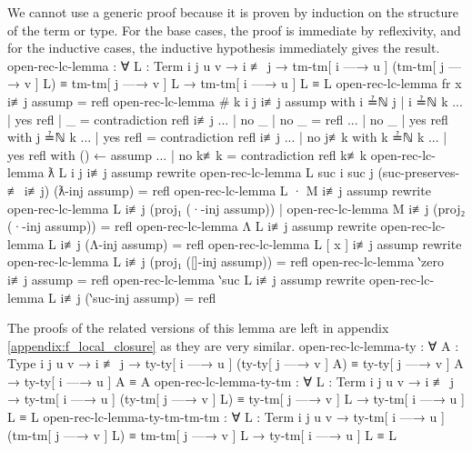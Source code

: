 \documentclass[logo,bsc,singlespacing,parskip,online]{infthesis}
\renewenvironment{code}{\mintedcopy[breaklines,breaksymbolleft=\;]{agda}}{\endmintedcopy}
\begin{document}
We cannot use a generic proof because it is proven by induction on the structure of the term or
type. For the base cases, the proof is immediate by reflexivity, and for the inductive cases, the
inductive hypothesis immediately gives the result.
\begin{code}
  open-rec-lc-lemma : ∀ {L : Term} {i j u v} → i ≢ j
    → tm-tm[ i —→ u ] (tm-tm[ j —→ v ] L) ≡ tm-tm[ j —→ v ] L
    → tm-tm[ i —→ u ] L ≡ L
  open-rec-lc-lemma {fr x} i≢j assump = refl
  open-rec-lc-lemma {# k} {i} {j} i≢j assump
    with i ≟ℕ j | i ≟ℕ k
  ... | yes refl | _ = contradiction refl i≢j
  ... | no _     | no _ = refl
  ... | no _     | yes refl with j ≟ℕ k
  ...   | yes refl = contradiction refl i≢j
  ...   | no j≢k with k ≟ℕ k
  ...     | yes refl with () ← assump
  ...     | no  k≢k  = contradiction refl k≢k
  open-rec-lc-lemma {ƛ L} {i} {j} i≢j assump
    rewrite open-rec-lc-lemma {L} {suc i} {suc j}
      (suc-preserves-≢ i≢j)
      (ƛ-inj assump) = refl
  open-rec-lc-lemma {L · M} i≢j assump rewrite
      open-rec-lc-lemma {L} i≢j (proj₁ (·-inj assump))
    | open-rec-lc-lemma {M} i≢j (proj₂ (·-inj assump)) = refl
  open-rec-lc-lemma {Λ L} i≢j assump
    rewrite open-rec-lc-lemma {L} i≢j (Λ-inj assump) = refl
  open-rec-lc-lemma {L [ x ]} i≢j assump
    rewrite open-rec-lc-lemma {L} i≢j (proj₁ ([]-inj assump)) = refl
  open-rec-lc-lemma {‵zero} i≢j assump = refl
  open-rec-lc-lemma {‵suc L} i≢j assump
    rewrite open-rec-lc-lemma {L} i≢j (‵suc-inj assump) = refl
\end{code}

The proofs of the related versions of this lemma are left in appendix \ref{appendix:f_local_closure} as they are very similar.
\begin{code}
  open-rec-lc-lemma-ty : ∀ {A : Type} {i j u v} → i ≢ j
    → ty-ty[ i —→ u ] (ty-ty[ j —→ v ] A) ≡ ty-ty[ j —→ v ] A
    → ty-ty[ i —→ u ] A ≡ A
  open-rec-lc-lemma-ty-tm : ∀ {L : Term} {i j u v} → i ≢ j
    → ty-tm[ i —→ u ] (ty-tm[ j —→ v ] L) ≡ ty-tm[ j —→ v ] L
    → ty-tm[ i —→ u ] L ≡ L
  open-rec-lc-lemma-ty-tm-tm-tm : ∀ {L : Term} {i j u v}
    → ty-tm[ i —→ u ] (tm-tm[ j —→ v ] L) ≡ tm-tm[ j —→ v ] L
    → ty-tm[ i —→ u ] L ≡ L
\end{code}
\end{document}
